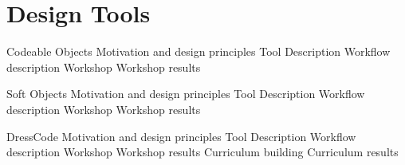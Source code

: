 \chapter{Design Tools}

	Codeable Objects
		Motivation and design principles
		Tool Description
		Workflow description
		Workshop
		Workshop results

	Soft Objects
		Motivation and design principles
		Tool Description
		Workflow description
		Workshop
		Workshop results
		
	DressCode
		Motivation and design principles
		Tool Description
		Workflow description
		Workshop
		Workshop results
		Curriculum building
		Curriculum results
